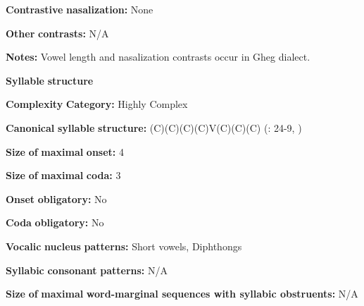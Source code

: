 \documentclass[output=paper]{langsci/langscibook}
\begin{document}
\begin{styleBody}
\textbf{Contrastive} \textbf{nasalization:} None
\end{styleBody}

\begin{styleBody}
\textbf{Other} \textbf{contrasts:} N/A
\end{styleBody}

\begin{styleBody}
\textbf{Notes:} Vowel length and nasalization contrasts occur in Gheg dialect.
\end{styleBody}

\begin{styleBody}
\textbf{Syllable} \textbf{structure}
\end{styleBody}

\begin{styleBody}
\textbf{Complexity} \textbf{Category:} Highly Complex
\end{styleBody}

\begin{styleBody}
\textbf{Canonical} \textbf{syllable} \textbf{structure:} (C)(C)(C)(C)V(C)(C)(C) (\citealt{Newmark1957}: 24-9, \citealt{Klippenstein2010})
\end{styleBody}

\begin{styleBody}
\textbf{Size} \textbf{of} \textbf{maximal} \textbf{onset:} 4
\end{styleBody}

\begin{styleBody}
\textbf{Size} \textbf{of} \textbf{maximal} \textbf{coda:} 3
\end{styleBody}

\begin{styleBody}
\textbf{Onset} \textbf{obligatory:} No
\end{styleBody}

\begin{styleBody}
\textbf{Coda} \textbf{obligatory:} No
\end{styleBody}

\begin{styleBody}
\textbf{Vocalic} \textbf{nucleus} \textbf{patterns:} Short vowels, Diphthongs
\end{styleBody}

\begin{styleBody}
\textbf{Syllabic} \textbf{consonant} \textbf{patterns:} N/A
\end{styleBody}

\begin{styleBody}
\textbf{Size} \textbf{of} \textbf{maximal} \textbf{word{}-marginal sequences with syllabic obstruents:} N/A
\end{styleBody}
\end{document}
